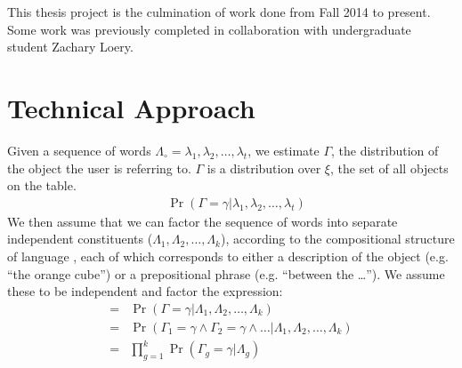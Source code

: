 \documentclass[conference]{IEEEtran}
\numberwithin{equation}{section}
\begin{document}
This thesis project is the culmination of work done from Fall 2014 to present. Some work was previously completed in collaboration with undergraduate student Zachary Loery.


\section{Technical Approach}

Given a sequence of words $\Lambda_\circ = \lambda_1, \lambda_2, \ldots, \lambda_t$, we estimate $\Gamma$, the distribution of the object the user is referring to. $\Gamma$ is a distribution over $\xi$, the set of all objects on the table.
\begin{align}
	& \Pr(\Gamma = \gamma | \lambda_1, \lambda_2, \ldots, \lambda_t)
\end{align}
We then assume that we can factor the sequence of words into separate independent constituents ($\Lambda_1, \Lambda_2, \ldots, \Lambda_k$), according to the compositional structure of language \citep{heim1998semantics}, each of which corresponds to either a description of the object (e.g. ``the orange cube'') or a prepositional phrase (e.g. ``between the \ldots''). We assume these to be independent and factor the expression:
\begin{align}
   = & \Pr(\Gamma = \gamma | \Lambda_1, \Lambda_2, \ldots, \Lambda_k) 
\\ = & \Pr(\Gamma_1 = \gamma \land \Gamma_2 = \gamma \land \ldots | \Lambda_1, \Lambda_2, \ldots, \Lambda_k)
\\ = & \prod_{g=1}^k \Pr(\Gamma_g = \gamma | \Lambda_g) 
\end{align}
\end{document}
